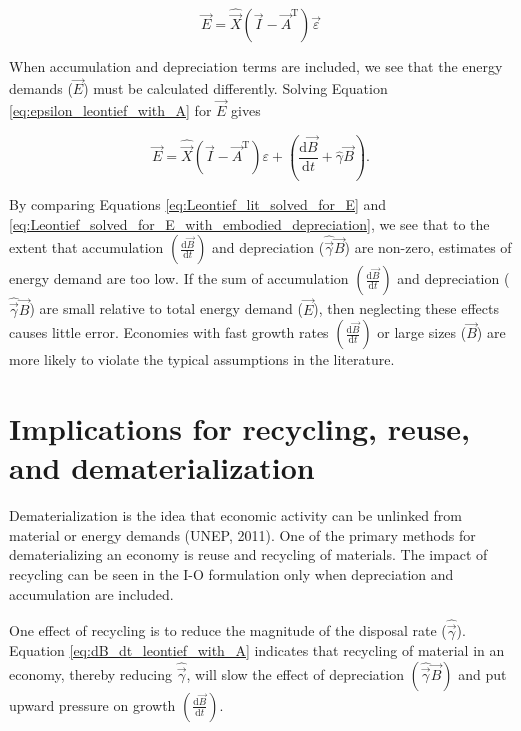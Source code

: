\begin{equation} \label{eq:Leontief_lit_solved_for_E}
	\vec{E} = \hat{\vec{X}}(\vec{I} - \vec{A}^{\mathrm{T}})\vec{\varepsilon}
\end{equation}

When accumulation and depreciation terms are included, we see that the energy demands ($\vec{E}$) must be calculated differently. Solving Equation \ref{eq:epsilon_leontief_with_A} for $\vec{E}$ gives 

\begin{equation} \label{eq:Leontief_solved_for_E_with_embodied_depreciation}
	\vec{E} = \hat{\vec{X}}(\vec{I} - \vec{A}^{\mathrm{T}})\varepsilon + \left(\frac{\mathrm{d}\vec{B}}{\mathrm{d}t} + \hat{\gamma}\vec{B}\right).
\end{equation}

\noindent By comparing Equations \ref{eq:Leontief_lit_solved_for_E} and \ref{eq:Leontief_solved_for_E_with_embodied_depreciation}, we see that to the extent that accumulation $\left(\frac{\mathrm{d}\vec{B}}{\mathrm{d}t}\right)$ and depreciation ($\hat{\vec{\gamma}}\vec{B}$) are non-zero, estimates of energy demand are too low. If the sum of accumulation $\left(\frac{\mathrm{d}\vec{B}}{\mathrm{d}t}\right)$ and depreciation ($\hat{\vec{\gamma}}\vec{B}$) are small relative to total energy demand ($\vec{E}$), then neglecting these effects causes little error. Economies with fast growth rates $\left(\frac{\mathrm{d}\vec{B}}{\mathrm{d}t}\right)$ or large sizes ($\vec{B}$) are more likely to violate the typical assumptions in the literature.


\section{Implications for recycling, reuse, and dematerialization}

Dematerialization is the idea that economic activity can be unlinked from material or energy demands (UNEP, 2011). One of the primary methods for dematerializing an economy is reuse and recycling of materials. The impact of recycling can be seen in the I-O formulation only when depreciation and accumulation are included. 

One effect of recycling is to reduce the magnitude of the disposal rate ($\hat{\vec{\gamma}}$). Equation \ref{eq:dB_dt_leontief_with_A} indicates that recycling of material in an economy, thereby reducing $\hat{\vec{\gamma}}$, will slow the effect of depreciation $\left(\hat{\vec{\gamma}}\vec{B}\right)$ and put upward pressure on growth $\left(\frac{\mathrm{d}\vec{B}}{\mathrm{d}t}\right)$. 

